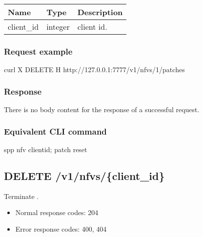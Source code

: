 \documentclass[a4paper,11pt,openany,oneside,english]{sphinxmanual}
\begin{document}
\begin{savenotes}\sphinxattablestart
\centering
{}
\sphinxthecaptionisattop
{}\label{\detokenize{api_ref/spp_nfv:id32}}\label{\detokenize{api_ref/spp_nfv:table-spp-ctl-spp-nfv-del-patches}}
\sphinxaftertopcaption
\begin{tabulary}{\linewidth}[t]{|T|T|T|}
\hline
\sphinxstyletheadfamily 
Name
&\sphinxstyletheadfamily 
Type
&\sphinxstyletheadfamily 
Description
\\
\hline
client\_id
&
integer
&
client id.
\\
\hline
\end{tabulary}
\par
\sphinxattableend\end{savenotes}


\subsubsection{Request example}
\label{\detokenize{api_ref/spp_nfv:id16}}
\begin{sphinxVerbatim}[commandchars=\\\{\},formatcom=\footnotesize]
 curl \PYGZhy{}X DELETE \PYGZhy{}H  
  http://127.0.0.1:7777/v1/nfvs/1/patches
\end{sphinxVerbatim}


\subsubsection{Response}
\label{\detokenize{api_ref/spp_nfv:id17}}
There is no body content for the response of a successful  request.


\subsubsection{Equivalent CLI command}
\label{\detokenize{api_ref/spp_nfv:id18}}
\begin{sphinxVerbatim}[commandchars=\\\{\},formatcom=\footnotesize]
spp \PYGZgt{} nfv \PYGZob{}client\PYGZus{}id\PYGZcb{}; patch reset
\end{sphinxVerbatim}


\subsection{DELETE /v1/nfvs/\{client\_id\}}
\label{\detokenize{api_ref/spp_nfv:delete-v1-nfvs-client-id}}
Terminate .
\begin{itemize}
\item {} 
Normal response codes: 204

\item {} 
Error response codes: 400, 404

\end{itemize}
\end{document}
